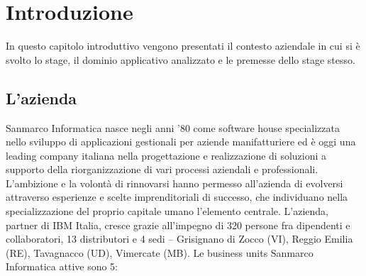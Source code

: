\chapter{Introduzione}
\begin{flushright}
	In questo capitolo introduttivo vengono presentati il contesto aziendale in cui si è svolto lo stage, il dominio applicativo analizzato e le premesse dello stage stesso.
\end{flushright}

\section{L'azienda}
Sanmarco Informatica nasce negli anni '80 come \gls{software house} specializzata nello sviluppo di applicazioni gestionali per aziende manifatturiere ed è oggi una leading company italiana nella progettazione e realizzazione di soluzioni a supporto della riorganizzazione di vari processi aziendali e professionali. L’ambizione e la volontà di rinnovarsi hanno permesso all'azienda di evolversi attraverso esperienze e scelte imprenditoriali di successo, che individuano nella specializzazione del proprio capitale umano l'elemento centrale. L'azienda, partner di \acrshort{IBM} Italia, cresce grazie all'impegno di 320 persone fra dipendenti e collaboratori, 13 distributori e 4 sedi – Grisignano di Zocco (VI), Reggio Emilia (RE), Tavagnacco (UD), Vimercate (MB). Le business units Sanmarco Informatica attive sono 5:
